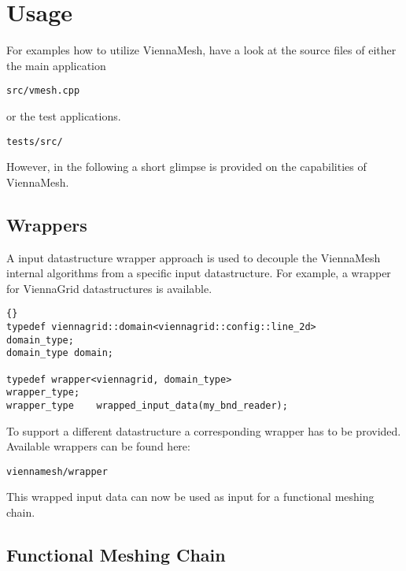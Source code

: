 
\section{Usage} 

For examples how to utilize ViennaMesh, have a look at the source files 
of either the main application

\begin{exaipd}
\begin{Verbatim}
src/vmesh.cpp
\end{Verbatim}
\end{exaipd}

or the test applications.

\begin{exaipd}
\begin{Verbatim}
tests/src/
\end{Verbatim}
\end{exaipd}

However, in the following a short glimpse is provided on the capabilities of 
ViennaMesh. 

\subsection{Wrappers}
A input datastructure wrapper approach is used to decouple the 
ViennaMesh internal algorithms from a specific input datastructure.
For example, a wrapper for ViennaGrid datastructures is available.

\begin{lstlisting}{}
typedef viennagrid::domain<viennagrid::config::line_2d>     domain_type;
domain_type domain;

typedef wrapper<viennagrid, domain_type>                    wrapper_type;
wrapper_type    wrapped_input_data(my_bnd_reader);      
\end{lstlisting}

To support a different datastructure a corresponding wrapper has to be provided.
Available wrappers can be found here:
\begin{exaipd}
\begin{Verbatim}
viennamesh/wrapper
\end{Verbatim}
\end{exaipd}

This wrapped input data can now be used as input for a functional meshing chain.

\subsection{Functional Meshing Chain}

